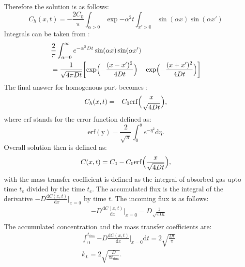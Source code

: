 \documentclass{article}
\begin{document}
\begin{description}
\begin{equation}
\end{equation}
Therefore the solution is as follows:
\begin{equation}
C_h(x,t)=-\frac{2 C_0}{\pi}\int_{\alpha>0} {\exp{-\alpha^2 t} \int_{x'>0}{\sin(\alpha x) \sin(\alpha
x')}} 
\end{equation}
Integrals can be taken from \citet{ozisik}:
\begin{equation}
\begin{aligned}
&\frac{2}{\pi}\int_{\alpha=0}^{\infty}{e^{-\alpha^2 D t} \sin(\alpha x) \sin(\alpha
x')}\\
&=\frac{1}{\sqrt{4\pi D t}}\biggl[\exp\Bigl(-\frac{(x-x')^2}{4 D
t}\Bigr)-\exp\Bigl(-\frac{(x+x')^2}{4 D t}\Bigr)\biggr]
\end{aligned}
\end{equation}
The final answer for homogenous part becomes \cite{ozisik}:
\begin{equation}
C_h(x,t)=-C_0\mathrm{erf}\Bigl(\frac{x}{\sqrt{4 D t}}\Bigr),
\end{equation}
where $\mathrm{erf}$ stands for the error function defined as:
\begin{equation}
\mathrm{erf(y)}=\frac{2}{\sqrt{\pi}}\int_{0}^{y}{e^{-\eta^2}\mathrm{d}\eta}.
\end{equation}
Overall solution then is defined as:
\begin{equation}
C(x,t)=C_0-C_0\mathrm{erf}\Bigl(\frac{x}{\sqrt{4 D t}}\Bigr),
\end{equation}
with the mass transfer coefficient is defined as the integral of absorbed gas upto time $t_e$
divided by the time $t_e$. The accumulated  flux is the integral of the derivative
$-D\frac{\mathrm{d} C(x,t)}{\mathrm{d}x}|_{x=0}$ by time $t$. The incoming flux is as follows:
\begin{equation}
\begin{aligned}
&-D\frac{\mathrm{d} C(x,t)}{\mathrm{d}x}|_{x=0}=D \frac{1}{\sqrt{\pi D t}}\\
\end{aligned}
\end{equation}
The accumulated concentration and the mass transfer coefficients are:
\begin{equation}
\begin{aligned}
&\int_{0}^{t_{\mathrm{film}}}{-D\frac{\mathrm{d} C(x,t)}{\mathrm{d}x}|_{x=0} \mathrm{d}t}=2
\sqrt{ \frac{D t}{\pi}}\\
&k_L = 2 \sqrt{\frac{D}{\pi t_{\mathrm{film}}}}.
\end{aligned}
\end{equation}

\end{description}
\end{document}
